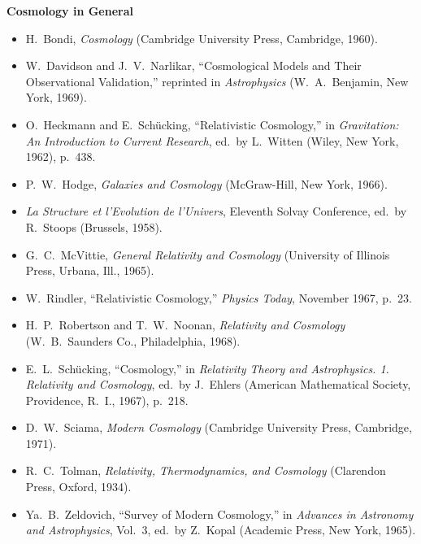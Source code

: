 \medskip
\noindent\textbf{Cosmology in General}\par
\begin{itemize}
  \item[\(\square\)] H.~Bondi, \emph{Cosmology}
  (Cambridge University Press, Cambridge, 1960).

  \item[\(\square\)] W.~Davidson and J.~V.~Narlikar,
  ``Cosmological Models and Their Observational Validation,'' reprinted in
  \emph{Astrophysics} (W.~A.~Benjamin, New York, 1969).

  \item[\(\square\)] O.~Heckmann and E.~Sch\"ucking,
  ``Relativistic Cosmology,'' in \emph{Gravitation: An Introduction to
  Current Research}, ed.\ by L.~Witten (Wiley, New York, 1962), p.~438.

  \item[\(\square\)] P.~W.~Hodge, \emph{Galaxies and Cosmology}
  (McGraw-Hill, New York, 1966).

  \item[\(\square\)] \emph{La Structure et l'Evolution de l'Univers},
  Eleventh Solvay Conference, ed.\ by R.~Stoops (Brussels, 1958).

  \item[\(\square\)] G.~C.~McVittie,
  \emph{General Relativity and Cosmology}
  (University of Illinois Press, Urbana, Ill., 1965).

  \item[\(\square\)] W.~Rindler, ``Relativistic Cosmology,''
  \emph{Physics Today}, November 1967, p.~23.

  \item[\(\square\)] H.~P.~Robertson and T.~W.~Noonan,
  \emph{Relativity and Cosmology}
  (W.~B.~Saunders Co., Philadelphia, 1968).

  \item[\(\square\)] E.~L.~Sch\"ucking, ``Cosmology,'' in
  \emph{Relativity Theory and Astrophysics. 1. Relativity and Cosmology},
  ed.\ by J.~Ehlers (American Mathematical Society, Providence, R.~I.,
  1967), p.~218.

  \item[\(\square\)] D.~W.~Sciama, \emph{Modern Cosmology}
  (Cambridge University Press, Cambridge, 1971).

  \item[\(\square\)] R.~C.~Tolman,
  \emph{Relativity, Thermodynamics, and Cosmology}
  (Clarendon Press, Oxford, 1934).

  \item[\(\square\)] Ya.~B.~Zeldovich, ``Survey of Modern Cosmology,'' in
  \emph{Advances in Astronomy and Astrophysics}, Vol.~3, ed.\ by Z.~Kopal
  (Academic Press, New York, 1965).
\end{itemize}

